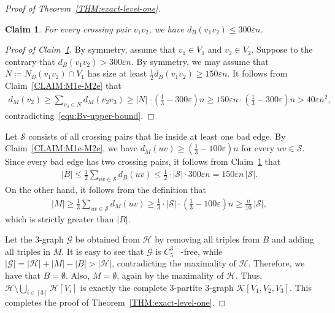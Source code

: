 \documentclass[11pt,a4paper]{article}
\newtheorem{claim}[definition]{Claim}
\theoremstyle{remark}
\begin{document}
\begin{proof}[Proof of Theorem~\ref{THM:exact-level-one}]
    \begin{claim}\label{CLAIM:max-codeg-bad}
       For every crossing pair $v_1v_2$, we have $d_B(v_1v_2) \le 300 \varepsilon n$.  
    \end{claim}
    \begin{proof}[Proof of Claim~\ref{CLAIM:max-codeg-bad}] 
    By symmetry, assume that $v_1\in V_1$ and $v_2\in V_2$.
        Suppose to the contrary that $d_{B}(v_1v_2) > 300 \varepsilon n$. 
        By symmetry, we may assume that $N \coloneqq N_{B}(v_1v_2) \cap V_1$ has size at least $\frac{1}{2} d_{B}(v_1v_2) \ge 150 \varepsilon n$. 
        It follows from Claim~\ref{CLAIM:M1e-M2e} that 
        \begin{align*}
            d_{M}(v_2)
            \ge \sum_{v_3 \in N} d_{M}(v_2v_3)
            \ge |N| \cdot \left(\frac{1}{3} - 300\varepsilon\right)n
            \ge 150 \varepsilon n \cdot \left(\frac{1}{3} - 300\varepsilon\right)n
            > 40\varepsilon n^2, 
        \end{align*}
        contradicting~\eqref{equ:Bv-upper-bound}. 
    \end{proof}

Let $\mathcal{S}$ consists of all crossing pairs that lie inside at least one bad edge.  By Claim~\ref{CLAIM:M1e-M2e}, we have $d_{M}(uv) \ge \left(\frac{1}{3} - 100\varepsilon\right)n$ for every $uv\in \mathcal{S}$. Since every bad edge has two crossing pairs,  it follows from Claim~\ref{CLAIM:max-codeg-bad} that 
    \begin{align*}
        |B|
        \le \frac12 \sum_{uv \in \mathcal{S}} d_{B}(uv) 
         \le \frac12\cdot |\mathcal{S}| \cdot 300 \varepsilon n
        = 150 \varepsilon n\,|\mathcal{S}|.
    \end{align*}  
    On the other hand, it follows from the definition that 
    \begin{align*}
        |M|
        \ge \frac{1}{3} \sum_{uv \in \mathcal{S}} d_{M}(uv)
        \ge \frac{1}{3} \cdot |\mathcal{S}| \cdot\left(\frac{1}{3} - 100\varepsilon\right)n
        \ge \frac{n}{10}\, |\mathcal{S}|, 
    \end{align*}
    which is strictly greater than $|B|$. 

    Let the $3$-graph $\mathcal{G}$ be obtained from $\mathcal{H}$ by removing all triples from $B$ and adding all triples in $M$. 
    It is easy to see that $\mathcal{G}$ is $C_{5}^{3-}$-free, while $|\mathcal{G}| = |\mathcal{H}| + |M| - |B| > |\mathcal{H}|$, contradicting the maximality of $\mathcal{H}$. 
    Therefore, we have that $B = \emptyset$. Also, $M=\emptyset$, again by the maximality of $\mathcal{H}$.
   Thus, $\mathcal{H} \setminus \bigcup_{i\in [3]}\mathcal{H}[V_i]$ is exactly the complete 3-partite 3-graph $\mathcal{K}[V_1,V_2,V_3]$. 
    This completes the proof of Theorem~\ref{THM:exact-level-one}. 
\end{proof}
\end{document}
